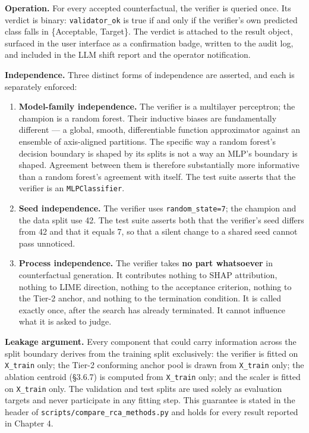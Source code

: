 \textbf{Operation.} For every accepted counterfactual, the verifier is queried once. Its verdict is binary: \texttt{validator\_ok} is true if and only if the verifier's own predicted class falls in \{Acceptable, Target\}. The verdict is attached to the result object, surfaced in the user interface as a confirmation badge, written to the audit log, and included in the LLM shift report and the operator notification.

\textbf{Independence.} Three distinct forms of independence are asserted, and each is separately enforced:

\begin{enumerate}
\def\labelenumi{\arabic{enumi}.}
\item
  \textbf{Model-family independence.} The verifier is a multilayer perceptron; the champion is a random forest. Their inductive biases are fundamentally different --- a global, smooth, differentiable function approximator against an ensemble of axis-aligned partitions. The specific way a random forest's decision boundary is shaped by its splits is not a way an MLP's boundary is shaped. Agreement between them is therefore substantially more informative than a random forest's agreement with itself. The test suite asserts that the verifier is an \texttt{MLPClassifier}.
\item
  \textbf{Seed independence.} The verifier uses \texttt{random\_state=7}; the champion and the data split use 42. The test suite asserts both that the verifier's seed differs from 42 and that it equals 7, so that a silent change to a shared seed cannot pass unnoticed.
\item
  \textbf{Process independence.} The verifier takes \textbf{no part whatsoever} in counterfactual generation. It contributes nothing to SHAP attribution, nothing to LIME direction, nothing to the acceptance criterion, nothing to the Tier-2 anchor, and nothing to the termination condition. It is called exactly once, after the search has already terminated. It cannot influence what it is asked to judge.
\end{enumerate}

\textbf{Leakage argument.} Every component that could carry information across the split boundary derives from the training split exclusively: the verifier is fitted on \texttt{X\_train} only; the Tier-2 conforming anchor pool is drawn from \texttt{X\_train} only; the ablation centroid (§3.6.7) is computed from \texttt{X\_train} only; and the scaler is fitted on \texttt{X\_train} only. The validation and test splits are used solely as evaluation targets and never participate in any fitting step. This guarantee is stated in the header of \texttt{scripts/compare\_rca\_methods.py} and holds for every result reported in Chapter 4.


